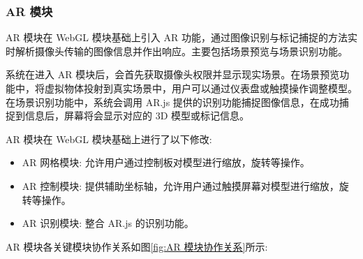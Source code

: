 \subsubsection{AR 模块}

AR 模块在 WebGL 模块基础上引入 AR 功能，通过图像识别与标记捕捉的方法实时解析摄像头传输的图像信息并作出响应。主要包括场景预览与场景识别功能。

系统在进入 AR 模块后，会首先获取摄像头权限并显示现实场景。在场景预览功能中，将虚拟物体投射到真实场景中，用户可以通过仪表盘或触摸操作调整模型。在场景识别功能中，系统会调用 AR.js 提供的识别功能捕捉图像信息，在成功捕捉到信息后，屏幕将会显示对应的 3D 模型或标记信息。

AR 模块在 WebGL 模块基础上进行了以下修改:
\begin{itemize}
  \item AR 网格模块: 允许用户通过控制板对模型进行缩放，旋转等操作。
  \item AR 控制模块: 提供辅助坐标轴，允许用户通过触摸屏幕对模型进行缩放，旋转等操作。
  \item AR 识别模块: 整合 AR.js 的识别功能。
\end{itemize}

AR 模块各关键模块协作关系如图\ref{fig:AR 模块协作关系}所示:

